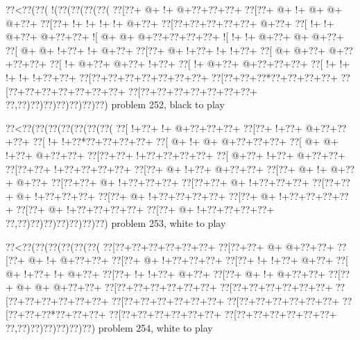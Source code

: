\vbox{\vbox{\goo
\0??<\0??(\0??(\- !(\0??(\0??(\0??(\0??(
\0??[\0??+\- @+\- !+\- @+\0??+\0??+\0??+
\0??[\0??+\- @+\- !+\- @+\- @+\- @+\0??+
\0??[\0??+\- !+\- !+\- !+\- !+\- @+\0??+
\0??[\0??+\0??+\0??+\0??+\0??+\- @+\0??+
\0??[\- !+\- !+\- @+\0??+\- @+\0??+\0??+
\- ![\- @+\- @+\- @+\0??+\0??+\0??+\0??+
\- ![\- !+\- !+\- @+\0??+\- @+\- @+\0??+
\0??[\- @+\- @+\- !+\0??+\- !+\- @+\0??+
\0??[\0??+\- @+\- !+\0??+\- !+\- !+\0??+
\0??[\- @+\- @+\0??+\- @+\0??+\0??+\0??+
\0??[\- !+\- @+\0??+\- @+\0??+\- !+\0??+
\0??[\- !+\- @+\0??+\- @+\0??+\0??+\0??+
\0??[\- !+\- !+\- !+\- !+\- !+\0??+\0??+
\0??[\0??+\0??+\0??+\0??+\0??+\0??+\0??+
\0??[\0??+\0??+\0??*\0??+\0??+\0??+\0??+
\0??[\0??+\0??+\0??+\0??+\0??+\0??+\0??+
\0??[\0??+\0??+\0??+\0??+\0??+\0??+\0??+
\0??,\0??)\0??)\0??)\0??)\0??)\0??)\0??)
}
\hfil problem 252, black to play\hfil\break
}

\vbox{\vbox{\goo
\0??<\0??(\0??(\0??(\0??(\0??(\0??(\0??(
\0??[\- !+\0??+\- !+\- @+\0??+\0??+\0??+
\0??[\0??+\- !+\0??+\- @+\0??+\0??+\0??+
\0??[\- !+\- !+\0??*\0??+\0??+\0??+\0??+
\0??[\- @+\- !+\- @+\- @+\0??+\0??+\0??+
\0??[\- @+\- @+\- !+\0??+\- @+\0??+\0??+
\0??[\0??+\0??+\- !+\0??+\0??+\0??+\0??+
\0??[\- @+\0??+\- !+\0??+\- @+\0??+\0??+
\0??[\0??+\0??+\- !+\0??+\0??+\0??+\0??+
\0??[\0??+\- @+\- !+\0??+\- @+\0??+\0??+
\0??[\0??+\- @+\- !+\- @+\0??+\- @+\0??+
\0??[\0??+\0??+\- @+\- !+\0??+\0??+\0??+
\0??[\0??+\0??+\- @+\- !+\0??+\0??+\0??+
\0??[\0??+\0??+\- @+\- !+\0??+\0??+\0??+
\0??[\0??+\- @+\- !+\0??+\0??+\0??+\0??+
\0??[\0??+\- @+\- !+\0??+\0??+\0??+\0??+
\0??[\0??+\- @+\- !+\0??+\0??+\0??+\0??+
\0??[\0??+\- @+\- !+\0??+\0??+\0??+\0??+
\0??,\0??)\0??)\0??)\0??)\0??)\0??)\0??)
}
\hfil problem 253, white to play\hfil\break
}

\vbox{\vbox{\goo
\0??<\0??(\0??(\0??(\0??(\0??(\0??(
\0??[\0??+\0??+\0??+\0??+\0??+\0??+
\0??[\0??+\0??+\- @+\- @+\0??+\0??+
\0??[\0??+\- @+\- !+\- @+\0??+\0??+
\0??[\0??+\- @+\- !+\0??+\0??+\0??+
\0??[\0??+\- !+\- !+\0??+\- @+\0??+
\0??[\- @+\- !+\0??+\- !+\- @+\0??+
\0??[\0??+\- !+\- !+\0??+\- @+\0??+
\0??[\0??+\- @+\- !+\- @+\0??+\0??+
\0??[\0??+\- @+\- @+\- @+\0??+\0??+
\0??[\0??+\0??+\0??+\0??+\0??+\0??+
\0??[\0??+\0??+\0??+\0??+\0??+\0??+
\0??[\0??+\0??+\0??+\0??+\0??+\0??+
\0??[\0??+\0??+\0??+\0??+\0??+\0??+
\0??[\0??+\0??+\0??+\0??+\0??+\0??+
\0??[\0??+\0??+\0??*\0??+\0??+\0??+
\0??[\0??+\0??+\0??+\0??+\0??+\0??+
\0??[\0??+\0??+\0??+\0??+\0??+\0??+
\0??,\0??)\0??)\0??)\0??)\0??)\0??)
}
\hfil problem 254, white to play\hfil\break
}

